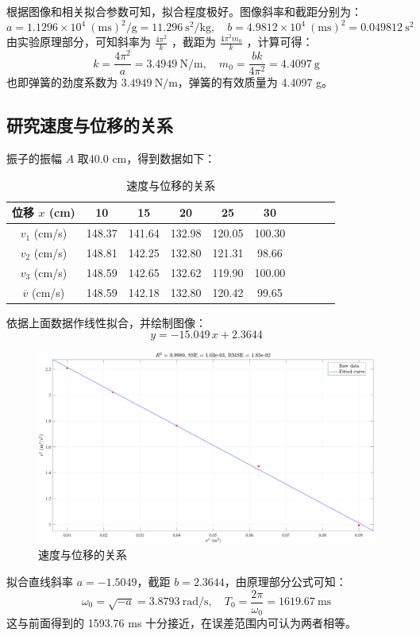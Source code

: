\documentclass[UTF8]{article}
\theoremstyle{MyLineTheoremStyle} %
\theoremstyle{MyBlockTheoremStyle} %
\theoremstyle{MySubsubsectionStyle} %
\begin{document}
    根据图像和相关拟合参数可知，拟合程度极好。图像斜率和截距分别为：
\begin{equation}
    a = 1.1296 \times 10^4 \ \mathrm{(ms)^2/g} = 11.296  \ \mathrm{s^2/kg},\quad 
    b = 4.9812 \times 10^4 \ \mathrm{(ms)^2} = 0.049812  \ \mathrm{s^2}
\end{equation}
    由实验原理部分，可知斜率为 $\frac{4{\pi ^2}}{k} $ ，截距为 $\frac{4{\pi ^2}m_0}{k}$ ，计算可得：
\begin{equation}
k = \frac{4\pi^2}{a} = 3.4949 \ \mathrm{N/m},\quad m_0 = \frac{bk}{4 \pi ^2} = 4.4097 \ \mathrm{g}
\end{equation}
也即弹簧的劲度系数为 $3.4949 \ \mathrm{N/m}$，弹簧的有效质量为 4.4097 g。

\subsection{研究速度与位移的关系}
    振子的振幅 $A$ 取40.0 cm，得到数据如下：
\begin{table}[H]\centering
    \caption{速度与位移的关系}
    \label{速度与位移的关系}
\begin{tabular}{cccccccccc}\toprule
    位移 $x$ (cm) & 10 & 15 & 20 & 25 & 30  \\
    \midrule
    $v_1$ (cm/s) &148.37	&141.64	&132.98	&120.05	&100.30 \\
    $v_2$ (cm/s) &148.81	&142.25	&132.80	&121.31	&98.66  \\
    $v_3$ (cm/s) &148.59	&142.65	&132.62	&119.90	&100.00 \\
    $\overline{v}$ (cm/s) &148.59	&142.18	&132.80	&120.42	&99.65  \\
    \bottomrule
\end{tabular}
\end{table}
依据上面数据作线性拟合，并绘制图像：
\begin{equation}
y = -15.049 \, x + 2.3644
\end{equation}
\begin{figure}[H]\centering
    \includegraphics[width=0.9\columnwidth]{assets/表4.pdf}
    \caption{速度与位移的关系}
\end{figure}
    拟合直线斜率 $a = -1.5049$，截距 $b = 2.3644$，由原理部分公式可知：
\begin{equation}
\omega_0 = \sqrt{-a} = 3.8793 \ \mathrm{rad/s},\quad  T_0 = \frac{2\pi }{\omega_0}= 1619.67 \ \mathrm{ms}
\end{equation}
这与前面得到的 1593.76 ms 十分接近，在误差范围内可认为两者相等。
\end{document}
